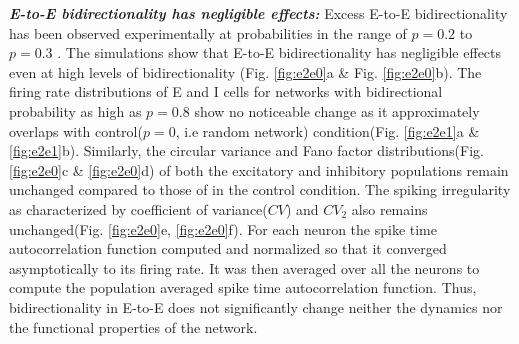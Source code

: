 \emph{\textbf{E-to-E bidirectionality has negligible effects:}} Excess E-to-E bidirectionality has been observed experimentally at probabilities in the range of $p = 0.2$ to $p = 0.3$ \cite{Song2005}. 
The simulations show that E-to-E bidirectionality has negligible effects even at high levels of bidirectionality (Fig. \ref{fig:e2e0}a \& Fig. \ref{fig:e2e0}b). The firing rate distributions of E and I cells for networks with bidirectional probability as high as $p = 0.8$ show no noticeable change as it approximately overlaps with control($p = 0$, i.e random network) condition(Fig. \ref{fig:e2e1}a \& \ref{fig:e2e1}b). Similarly, the circular variance and Fano factor distributions(Fig. \ref{fig:e2e0}c \& \ref{fig:e2e0}d) of both the excitatory and inhibitory populations remain unchanged compared to those of in the control condition. The spiking irregularity as characterized by coefficient of variance($CV$) and $CV_2$ also remains unchanged(Fig. \ref{fig:e2e0}e, \ref{fig:e2e0}f). For each neuron the spike time autocorrelation function computed and normalized so that it converged asymptotically to its firing rate. It was then averaged over all the neurons  to compute the population averaged spike time autocorrelation function. Thus, bidirectionality in E-to-E does not significantly change neither the dynamics nor the functional properties of the network. \\ 

